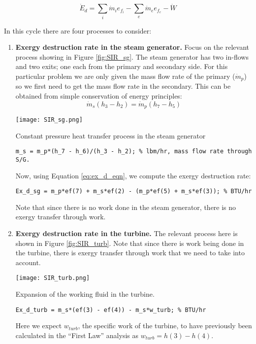 \begin{enumerate}
\begin{equation}
\dot{E}_d = \sum_{i}\dot{m}_i e_{f_i} - \sum_{e} \dot{m}_e e_{f_e} - \dot{W}
\label{eq:ex_d_eqn}
\end{equation}

In this cycle there are four processes to consider:
\begin{enumerate}
\item \textbf{Exergy destruction rate in the steam generator.}  Focus on the relevant process showing in Figure \ref{fig:SIR_sg}.  The steam generator has two in-flows and two exits; one each from the primary and secondary side.  For this particular problem we are only given the mass flow rate of the primary ($\dot{m}_p$) so we first need to get the mass flow rate in the secondary.  This can be obtained from simple conservation of energy principles:
$$ \dot{m}_s(h_3 - h_2) = \dot{m}_p(h_7 - h_5)$$

\begin{marginfigure}
\texttt{[image: SIR\_sg.png]}
\caption{Constant pressure heat transfer process in the steam generator}
\label{fig:SIR_sg}
\end{marginfigure}
\begin{lstlisting}
m_s = m_p*(h_7 - h_6)/(h_3 - h_2); % lbm/hr, mass flow rate through S/G.
\end{lstlisting}
Now, using Equation \ref{eq:ex_d_eqn}, we compute the exergy destruction rate:

\begin{lstlisting}
Ex_d_sg = m_p*ef(7) + m_s*ef(2) - (m_p*ef(5) + m_s*ef(3)); % BTU/hr
\end{lstlisting}
Note that since there is no work done in the steam generator, there is no exergy transfer through work.

\item \textbf{Exergy destruction rate in the turbine.} The relevant process here is shown in Figure \ref{fig:SIR_turb}.  Note that since there is work being done in the turbine, there is exergy transfer through work that we need to take into account.
\begin{marginfigure}
\texttt{[image: SIR\_turb.png]}
\caption{Expansion of the working fluid in the turbine.}
\label{fig:SIR_turb}
\end{marginfigure}
\begin{lstlisting}
Ex_d_turb = m_s*(ef(3) - ef(4)) - m_s*w_turb; % BTU/hr 
\end{lstlisting}
Here we expect $w_{turb}$, the specific work of the turbine, to have previously been calculated in the ``First Law'' analysis as $w_{turb} = h(3) - h(4)$.


\end{enumerate}
\end{enumerate}
